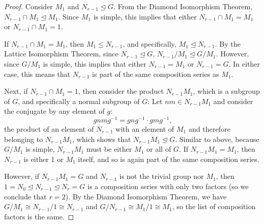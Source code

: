 \documentclass{article}
\begin{document}
\begin{proof}
    Consider $M_1$ and $N_{r - 1} \unlhd G$. From the Diamond Isomorphism Theorem, $N_{r - 1} \cap M_1 \unlhd M_1$. Since $M_1$ is simple, this implies that either $N_{r - 1} \cap M_1 = M_1$ or $N_{r - 1} \cap M_1 = 1$.

    If $N_{r - 1} \cap M_1 = M_1$, then $M_1 \leq N_{r - 1}$, and specifically, $M_1 \unlhd N_{r - 1}$. By the Lattice Isomorphism Theorem, since $N_{r - 1} \unlhd G$, $N_{r - 1}/M_1 \unlhd G/M_1$. However, since $G/M_1$ is simple, this implies that either $N_{r - 1} = M_1$ or $N_{r - 1} = G$. In either case, this means that $N_{r - 1}$ is part of the same composition series as $M_1$.

    Next, if $N_{r - 1} \cap M_1 = 1$, then consider the product $N_{r - 1} M_1$, which is a subgroup of $G$, and specifically a normal subgroup of $G$: Let $nm \in N_{r - 1} M_1$ and consider the conjugate by any element of $g$:
    \begin{equation*}
        gnmg^{-1} = gng^{-1} \cdot gmg^{-1},
    \end{equation*}
    the product of an element of $N_{r - 1}$ with an element of $M_1$ and therefore belonging to $N_{r - 1} M_1$, which shows that $N_{r - 1} M_1 \unlhd G$. Similar to above, because $G/M_1$ is simple, $N_{r - 1} M_1$ must be either $M_1$ or all of $G$. If $N_{r - 1} M_1 = M_1$, then $N_{r - 1}$ is either 1 or $M_1$ itself, and so is again part of the same composition series.

    However, if $N_{r - 1} M_1 = G$ and $N_{r - 1}$ is not the trivial group nor $M_1$, then $1 = N_0 \unlhd N_{r - 1} \unlhd N_r = G$ is a composition series with only two factors (so we conclude that $r = 2$). By the Diamond Isomorphism Theorem, we have $G/M_1 \cong N_{r - 1}/1 \cong N_{r - 1}$ and $G/N_{r - 1} \cong M_1/1 \cong M_1$, so the list of composition factors is the same.
\end{proof}
\end{document}

